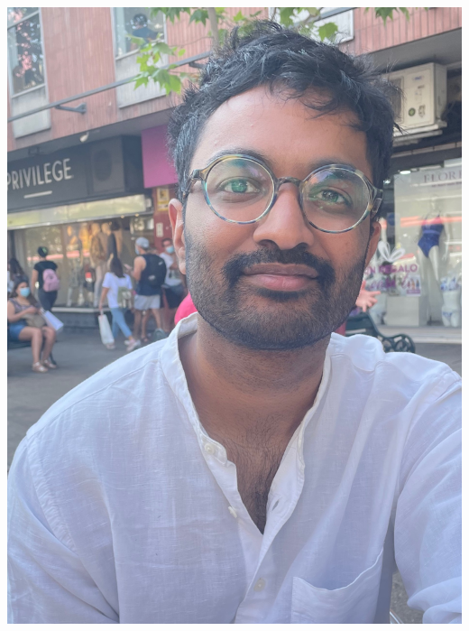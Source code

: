 \begin{frame}
\begin{columns}
\begin{column}{0.5\textwidth}
\begin{center}
\begin{minipage}{0.48\linewidth}
                   \centering
                \end{minipage}
                 \begin{minipage}{0.48\linewidth}
                    \includegraphics[width=0.9\linewidth]{assets/sri.jpeg}
                    \centering
                \end{minipage}%
                \begin{minipage}{0.48\linewidth}

\end{minipage}
\end{center}
\end{column}
\end{columns}
\end{frame}
